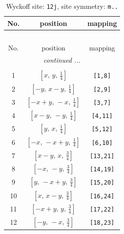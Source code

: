 \documentclass[fleqn,8pt]{jsarticle}
\begin{document}
\begin{longtable}{ccc}
\caption{Wyckoff site: {\tt 12j}, site symmetry: {\tt m..}}
 \\
 \hline \hline
No. & position & mapping \\ \hline \endfirsthead

\multicolumn{2}{l}{\tablename\ \thetable{}} \\
 \hline \hline
No. & position & mapping \\ \hline \endhead

 \hline \hline
\multicolumn{2}{r}{\footnotesize\it continued ...} \\ \endfoot

 \hline \hline
\multicolumn{2}{r}{} \\ \endlastfoot

1 & $\left[ x,\, y,\, \frac{1}{4} \right]$ & {\tt [1,8]} \\ \hline
2 & $\left[ - y,\, x - y,\, \frac{1}{4} \right]$ & {\tt [2,9]} \\ \hline
3 & $\left[ - x + y,\, - x,\, \frac{1}{4} \right]$ & {\tt [3,7]} \\ \hline
4 & $\left[ x - y,\, - y,\, \frac{1}{4} \right]$ & {\tt [4,11]} \\ \hline
5 & $\left[ y,\, x,\, \frac{1}{4} \right]$ & {\tt [5,12]} \\ \hline
6 & $\left[ - x,\, - x + y,\, \frac{1}{4} \right]$ & {\tt [6,10]} \\ \hline
7 & $\left[ x - y,\, x,\, \frac{3}{4} \right]$ & {\tt [13,21]} \\ \hline
8 & $\left[ - x,\, - y,\, \frac{3}{4} \right]$ & {\tt [14,19]} \\ \hline
9 & $\left[ y,\, - x + y,\, \frac{3}{4} \right]$ & {\tt [15,20]} \\ \hline
10 & $\left[ x,\, x - y,\, \frac{3}{4} \right]$ & {\tt [16,24]} \\ \hline
11 & $\left[ - x + y,\, y,\, \frac{3}{4} \right]$ & {\tt [17,22]} \\ \hline
12 & $\left[ - y,\, - x,\, \frac{3}{4} \right]$ & {\tt [18,23]} \\
\end{longtable}
\renewcommand{\arraystretch}{1.2}
\end{document}
